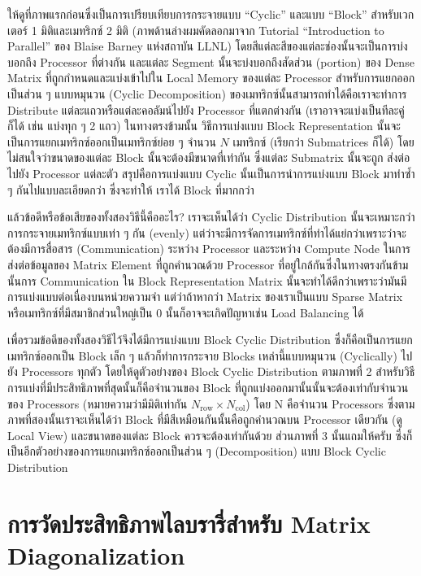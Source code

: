 ให้ดูที่ภาพแรกก่อนซึ่งเป็นการเปรียบเทียบการกระจายแบบ \enquote{Cyclic} และแบบ \enquote{Block} สำหรับเวกเตอร์ 1 มิติและเมทริกซ์
2 มิติ (ภาพด้านล่างผมคัดลอกมาจาก Tutorial \enquote{Introduction to Parallel} ของ Blaise Barney แห่งสถาบัน LLNL)
โดยสีแต่ละสีของแต่ละช่องนั้นจะเป็นการบ่งบอกถึง Processor ที่ต่างกัน และแต่ละ Segment นั้นจะบ่งบอกถึงสัดส่วน (portion) ของ Dense
Matrix ที่ถูกกำหนดและแบ่งเข้าไปใน Local Memory ของแต่ละ Processor สำหรับการแยกออกเป็นส่วน ๆ แบบหมุนวน (Cyclic Decomposition)
ของเมทริกซ์นั้นสามารถทำได้คือเราจะทำการ Distribute แต่ละแถวหรือแต่ละคอลัมน์ไปยัง Processor ที่แตกต่างกัน (เราอาจจะแบ่งเป็นทีละคู่ก็ได้
เช่น แบ่งทุก ๆ 2 แถว) ในทางตรงข้ามนั้น วิธีการแบ่งแบบ Block Representation นั้นจะเป็นการแยกเมทริกซ์ออกเป็นเมทริกซ์ย่อย ๆ จำนวน
$N$ เมทริกซ์ (เรียกว่า Submatrices ก็ได้) โดยไม่สนใจว่าขนาดของแต่ละ Block นั้นจะต้องมีขนาดที่เท่ากัน ซึ่งแต่ละ Submatrix นั้นจะถูก%
ส่งต่อไปยัง Processor แต่ละตัว สรุปคือการแบ่งแบบ Cyclic นั้นเป็นการนำการแบ่งแบบ Block มาทำซ้ำ ๆ กันไปแบบละเอียดกว่า ซึ่งจะทำให้%
เราได้ Block ที่มากกว่า

แล้วข้อดีหรือข้อเสียของทั้งสองวิธีนี้คืออะไร? เราจะเห็นได้ว่า Cyclic Distribution นั้นจะเหมาะกว่าการกระจายเมทริกซ์แบบเท่า ๆ กัน (evenly)
แต่ว่าจะมีการจัดการเมทริกซ์ที่ทำได้แย่กว่าเพราะว่าจะต้องมีการสื่อสาร (Communication) ระหว่าง Processor และระหว่าง Compute Node
ในการส่งต่อข้อมูลของ Matrix Element ที่ถูกคำนวณด้วย Processor ที่อยู่ใกล้กันซึ่งในทางตรงกันข้ามนั้นการ Communication ใน Block
Representation Matrix นั้นจะทำได้ดีกว่าเพราะว่ามันมีการแบ่งแบบต่อเนื่องบนหน่วยความจำ แต่ว่าถ้าหากว่า Matrix ของเราเป็นแบบ Sparse
Matrix หรือเมทริกซ์ที่มีสมาชิกส่วนใหญ่เป็น 0 นั้นก็อาจจะเกิดปัญหาเช่น Load Balancing ได้

เพื่อรวมข้อดีของทั้งสองวิธีไว้จึงได้มีการแบ่งแบบ Block Cyclic Distribution ซึ่งก็คือเป็นการแยกเมทริกซ์ออกเป็น Block เล็ก ๆ แล้วก็ทำการกระจาย
Blocks เหล่านี้แบบหมุนวน (Cyclically) ไปยัง Processors ทุกตัว โดยให้ดูตัวอย่างของ Block Cyclic Distribution ตามภาพที่ 2
สำหรับวิธีการแบ่งที่มีประสิทธิภาพที่สุดนั้นก็คือจำนวนของ Block ที่ถูกแบ่งออกมานั้นนั้นจะต้องเท่ากับจำนวนของ Processors
(หมายความว่ามีมิติเท่ากัน $N_{\text{row}} \times N_{\text{col}}$)
โดย N คือจำนวน Processors ซึ่งตามภาพที่สองนั้นเราจะเห็นได้ว่า Block ที่มีสีเหมือนกันนั้นคือถูกคำนวณบน Processor เดียวกัน (ดู Local View)
และขนาดของแต่ละ Block ควรจะต้องเท่ากันด้วย ส่วนภาพที่ 3 นั้นแถมให้ครับ ซึ่งก็เป็นอีกตัวอย่างของการแยกเมทริกซ์ออกเป็นส่วน ๆ (Decomposition)
แบบ Block Cyclic Distribution

\section{การวัดประสิทธิภาพไลบรารี่สำหรับ Matrix Diagonalization}


